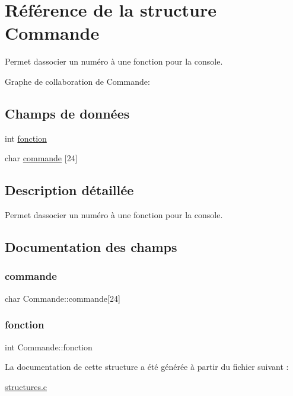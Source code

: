 \hypertarget{structCommande}{}\section{Référence de la structure Commande}
\label{structCommande}


Permet d\textquotesingle{}associer un numéro à une fonction pour la console.  




Graphe de collaboration de Commande\+:
\subsection*{Champs de données}
\begin{DoxyCompactItemize}
\item 
int \hyperlink{structCommande_a6770dd5c46f439e450695db4263fc6ad}{fonction}
\item 
char \hyperlink{structCommande_a020bf61b62003aa24b85b8c11ecfd008}{commande} \mbox{[}24\mbox{]}
\end{DoxyCompactItemize}


\subsection{Description détaillée}
Permet d\textquotesingle{}associer un numéro à une fonction pour la console. 

\subsection{Documentation des champs}
\mbox{\label{structCommande_a020bf61b62003aa24b85b8c11ecfd008}} 
\subsubsection{\texorpdfstring{commande}{commande}}
{\footnotesize\ttfamily char Commande\+::commande\mbox{[}24\mbox{]}}

\mbox{\label{structCommande_a6770dd5c46f439e450695db4263fc6ad}} 
\subsubsection{\texorpdfstring{fonction}{fonction}}
{\footnotesize\ttfamily int Commande\+::fonction}



La documentation de cette structure a été générée à partir du fichier suivant \+:\begin{DoxyCompactItemize}
\item 
\hyperlink{structures_8c}{structures.\+c}\end{DoxyCompactItemize}

